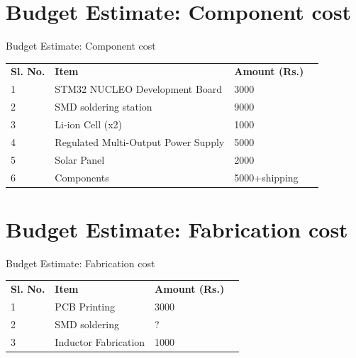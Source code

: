 \documentclass[aspectratio=169]{beamer}
\begin{document}
\section{Budget Estimate: Component cost}
\begin{frame}{Budget Estimate: Component cost}

\begin{table}[]
	\begin{tabular}{|l|l|l|l}
		\cline{1-3}
		\textbf{Sl. No.} & \textbf{Item}                       & \textbf{Amount (Rs.)} &  \\ \cline{1-3}
		1                & STM32 NUCLEO Development Board      & 3000                  &  \\ \cline{1-3}
		2                & SMD soldering station               & 9000                  &  \\ \cline{1-3}
		3                & Li-ion Cell (x2)                  & 1000                  &  \\ \cline{1-3}
		4                & Regulated Multi-Output Power Supply & 5000                  &  \\ \cline{1-3}
		5                & Solar Panel                         & 2000                    &  \\ \cline{1-3}
		6                & Components                          & 5000+shipping         &  \\ \cline{1-3}
	\end{tabular}
\end{table}

		

\end{frame}

\section{Budget Estimate: Fabrication cost}
\begin{frame}{Budget Estimate: Fabrication cost}
\begin{table}[]
	\begin{tabular}{|l|l|l|l}
		\cline{1-3}
		\textbf{Sl. No.} & \textbf{Item}        & \textbf{Amount (Rs.)} &  \\ \cline{1-3}
		1                & PCB Printing         & 3000                    &  \\ \cline{1-3}
		2                & SMD soldering        & ?                     &  \\ \cline{1-3}
		3                & Inductor Fabrication & 1000                  &  \\ \cline{1-3}
	\end{tabular}
\end{table}
\end{frame}
\end{document}
